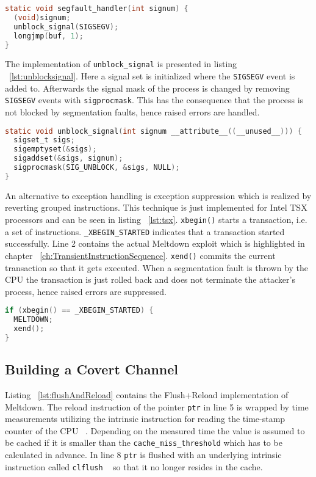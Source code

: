 \documentclass[a4paper,oneside,openright] {scrreprt}
\begin{document}
\begin{lstlisting}[language=C, caption=Meltdown: Exception Handling 1, label={lst:signalhandler}]
static void segfault_handler(int signum) {
  (void)signum;
  unblock_signal(SIGSEGV);
  longjmp(buf, 1);
}
\end{lstlisting}

The implementation of \texttt{unblock\_signal} is presented in listing ~\ref{lst:unblocksignal}. 
Here a signal set is initialized where the \texttt{SIGSEGV} event is added to.
Afterwards the signal mask of the process is changed by removing \texttt{SIGSEGV} events with \texttt{sigprocmask}.
This has the consequence that the process is not blocked by segmentation faults, hence raised errors are handled.

\begin{lstlisting}[language=C, caption=Meltdown: Exception Handling 2, label={lst:unblocksignal}]
static void unblock_signal(int signum __attribute__((__unused__))) {
  sigset_t sigs;
  sigemptyset(&sigs);
  sigaddset(&sigs, signum);
  sigprocmask(SIG_UNBLOCK, &sigs, NULL);
}
\end{lstlisting}

An alternative to exception handling is exception suppression which is realized by reverting grouped instructions.
This technique is just implemented for Intel TSX processors and can be seen in listing ~\ref{lst:tsx}.
\texttt{xbegin()} starts a transaction, i.e. a set of instructions.
\texttt{\_XBEGIN\_STARTED} indicates that a transaction started successfully.
Line 2 contains the actual Meltdown exploit which is highlighted in chapter ~\ref{ch:TransientInstructionSequence}.
\texttt{xend()} commits the current transaction so that it gets executed.
When a segmentation fault is thrown by the CPU the transaction is just rolled back and does not terminate the attacker's process,
hence raised errors are suppressed.

\begin{lstlisting}[language=C, caption=Meltdown: Exception Suppression on Intel TSX, label={lst:tsx}]
if (xbegin() == _XBEGIN_STARTED) {
  MELTDOWN;
  xend();
}
\end{lstlisting}

\subsection{Building a Covert Channel}
\label{ch:intro:motivation:A}

Listing ~\ref{lst:flushAndReload} contains the Flush+Reload implementation of Meltdown. 
The reload instruction of the pointer \texttt{ptr} in line 5 is wrapped 
by time measurements utilizing the intrinsic instruction for reading the time-stamp counter of the CPU ~\cite{intelintrinsics}. 
Depending on the measured time the value is assumed to be cached if it is smaller
than the \texttt{cache\_miss\_threshold} which has to be calculated in advance.
In line 8 \texttt{ptr} is flushed with an underlying intrinsic instruction called \texttt{clflush} ~\cite{intelintrinsics}
so that it no longer resides in the cache.
\end{document}
